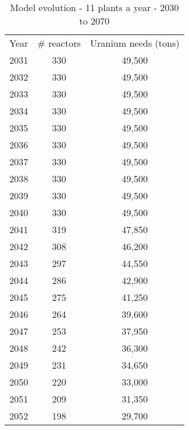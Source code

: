 {\tiny
\begin{table}[]
\centering
\caption{Model evolution - 11 plants a year - 2030 to 2070}
\label{my-label}
\begin{tabular}{ccc}
\multicolumn{1}{c}{Year} & \# reactors & Uranium needs (tons) \\
2031                     & 330         & 49,500               \\
2032                     & 330         & 49,500               \\
2033                     & 330         & 49,500               \\
2034                     & 330         & 49,500               \\
2035                     & 330         & 49,500               \\
2036                     & 330         & 49,500               \\
2037                     & 330         & 49,500               \\
2038                     & 330         & 49,500               \\
2039                     & 330         & 49,500               \\
2040                     & 330         & 49,500               \\
2041                     & 319         & 47,850               \\
2042                     & 308         & 46,200               \\
2043                     & 297         & 44,550               \\
2044                     & 286         & 42,900               \\
2045                     & 275         & 41,250               \\
2046                     & 264         & 39,600               \\
2047                     & 253         & 37,950               \\
2048                     & 242         & 36,300               \\
2049                     & 231         & 34,650               \\
2050                     & 220         & 33,000               \\
2051                     & 209         & 31,350               \\
2052                     & 198         & 29,700               \\

\end{tabular}
\end{table}}
